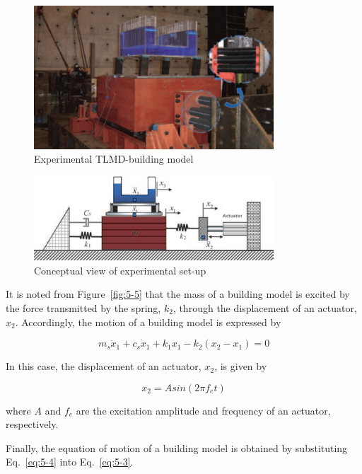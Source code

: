 \begin{figure}[ht]
\centering
\includegraphics[width=0.8\textwidth] {figure/5-3.eps}
\caption{Experimental TLMD-building model}
\label{fig:5-3}
\end{figure}

\begin{figure}[ht]
\centering
\includegraphics[width=0.8\textwidth] {figure/5-4.eps}
\caption{Conceptual view of experimental set-up}
\label{fig:5-4}
\end{figure}

It is noted from Figure~\ref{fig:5-5} that the mass of a building model is excited by the force transmitted by the spring, $k_{2}$, through the displacement of an actuator, $x_{2}$. Accordingly, the motion of a building model is expressed by

\begin{equation}\label{eq:5-3}
m_{s}\ddot{x}_{1}+c_{s}\dot{x}_{1}+k_{1}x_{1}-k_{2}\left(x_{2}-x_{1}\right)=0
\end{equation}

In this case, the displacement of an actuator, $x_{2}$, is given by

\begin{equation}\label{eq:5-4}
x_{2}=A sin \left(2 \pi f_{e} t \right)
\end{equation}

where $A$ and $f_{e}$ are the excitation amplitude and frequency of an actuator, respectively.

Finally, the equation of motion of a building model is obtained by substituting Eq.~\eqref{eq:5-4} into Eq.~\eqref{eq:5-3}.

